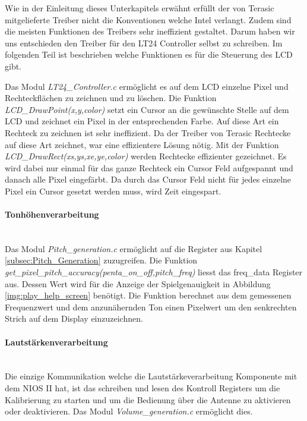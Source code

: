 Wie in der Einleitung dieses Unterkapitels erwähnt erfüllt der von Terasic mitgelieferte Treiber nicht die Konventionen welche Intel verlangt. Zudem sind die meisten Funktionen des Treibers sehr ineffizient gestaltet. Darum haben wir uns entschieden den Treiber für den LT24 Controller selbst zu schreiben. Im folgenden Teil ist beschrieben welche Funktionen es für die Steuerung des LCD gibt.

Das Modul \textit{LT24\_Controller.c} ermöglicht es auf dem LCD einzelne Pixel und Rechteckflächen zu zeichnen und zu löschen. Die Funktion \textit{LCD\_DrawPoint(x,y,color)} setzt ein Cursor an die gewünschte Stelle auf dem LCD und zeichnet ein Pixel in der entsprechenden Farbe. Auf diese Art ein Rechteck zu zeichnen ist sehr ineffizient. Da der Treiber von Terasic Rechtecke auf diese Art zeichnet, war eine effizientere Lösung nötig. Mit der Funktion \textit{LCD\_DrawRect(xs,ys,xe,ye,color)} werden Rechtecke effizienter gezeichnet. Es wird dabei nur einmal für das ganze Rechteck ein Cursor Feld aufgespannt und danach alle Pixel eingefärbt. Da durch das Cursor Feld nicht für jedes einzelne Pixel ein Cursor gesetzt werden muss, wird Zeit eingespart. 

\paragraph{Tonhöhenverarbeitung}\mbox{}\\

Das Modul \textit{Pitch\_generation.c} ermöglicht auf die Register aus Kapitel \ref{subsec:Pitch_Generation} zuzugreifen.
Die Funktion \textit{get\_pixel\_pitch\_accuracy(penta\_on\_off,pitch\_freq)} liesst das freq\_data Register aus. Dessen Wert wird für die Anzeige der Spielgenauigkeit in Abbildung \ref{img:play_help_screen} benötigt. Die Funktion berechnet aus dem gemessenen Frequenzwert und dem anzunähernden Ton einen Pixelwert um den senkrechten Strich auf dem Display einzuzeichnen.


\paragraph{Lautstärkenverarbeitung}\mbox{}\\
Die einzige Kommunikation welche die Lautstärkeverarbeitung Komponente mit dem NIOS II hat, ist das schreiben und lesen des Kontroll Registers um die Kalibrierung zu starten und um die Bedienung über die Antenne zu aktivieren oder deaktivieren. Das Modul \textit{Volume\_generation.c} ermöglicht dies. 
